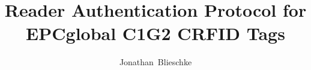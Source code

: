 \documentclass[journal]{IEEEtran}
\begin{document}
%
\title{Reader Authentication Protocol for\\EPCglobal C1G2 CRFID Tags}
%
%
%

\author{Jonathan~Blieschke}

% 
%
\end{document}
